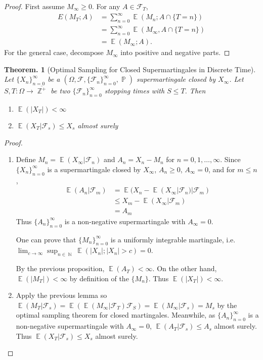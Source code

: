 \documentclass[11pt, a4paper]{memoir}
\DeclareMathOperator{\N}{{\mathbb{N}}}
\DeclareMathOperator{\Z}{{\mathbb{Z}}}
\theoremstyle{change}
\newtheorem{theorem}{Theorem.}[section]
\theoremstyle{plain}
\theoremstyle{nonumberplain}
\newtheorem{proof}{Proof}
\DeclareMathOperator{\pr}{{\mathbb{P}}}
\DeclareMathOperator{\E}{{\mathbb{E}}}
\numberwithin{equation}{section}
\begin{document}
\begin{proof}
    First assume $M_\infty\geq 0$.
    For any $A\in\mathcal{F}_T$,
    \begin{align*}
        E(M_T;A)&=\sum_{n=0}^\infty\E(M_n;A\cap\{T=n\})\\
                &=\sum_{n=0}^\infty\E(M_\infty,A\cap\{T=n\})\\
                &= \E(M_\infty;A).
    \end{align*}
    For the general case, decompose $M_\infty$ into positive and negative parts.
\end{proof}
\begin{theorem}[Optimal Sampling for Closed Supermartingales in Discrete Time]
    Let $\{X_n\}_{n=0}^\infty$ be a $(\Omega,\mathcal{F},\{\mathcal{F}_n\}_{n=0}^\infty,\pr)$ supermartingale closed by $X_\infty$.
    Let $S,T:\Omega\to\overline{\Z^+}$ be two $\{\mathcal{F}_n\}_{n=0}^\infty$ stopping times with $S\leq T$.
    Then
    \begin{enumerate}[nl]
        \item $\E(|X_T|)<\infty$
        \item $\E(X_T|\mathcal{F}_s)\leq X_s$ almost surely
    \end{enumerate}
\end{theorem}
\begin{proof}
    \begin{enumerate}[nl]
        \item Define $M_n=\E(X_\infty|\mathcal{F}_n)$ and $A_n=X_n-M_n$ for $n=0,1,\ldots,\infty$.
            Since $\{X_n\}_{n=0}^\infty$ is a supermartingale closed by $X_\infty$, $A_n\geq 0$, $A_\infty=0$, and for $m\leq n$,
            \begin{align*}
                \E(A_n|\mathcal{F}_m)&=\E(X_n-\E(X_\infty|\mathcal{F}_n)|\mathcal{F}_m)\\
                                     &\leq X_m-\E(X_\infty|\mathcal{F}_m)\\
                                     &= A_m
            \end{align*}
            Thus $\{A_n\}_{n=0}^\infty$ is a non-negative supermartingale with $A_\infty=0$.

            One can prove that $\{M_n\}_{n=0}^\infty$ is a uniformly integrable martingale, i.e. $\lim_{c\to\infty}\sup_{n\in\N}\E(|X_n|;|X_n|>c)=0$.

            By the previous proposition, $\E(A_T)<\infty$.
            On the other hand, $\E(|M_T|)<\infty$ by definition of the $\{M_n\}$.
            Thus $\E(|X_T|)<\infty$.
        \item Apply the previous lemma so $\E(M_T|\mathcal{F}_s)=\E(\E(M_\infty|\mathcal{F}_T)\mathcal{F}_S)=\E(M_\infty|\mathcal{F}_s)=M_s$ by the optimal sampling theorem for closed martingales.
            Meanwhile, as $\{A_n\}_{n=0}^\infty$ is a non-negative supermartingale with $A_\infty=0$, $\E(A_T|\mathcal{F}_s)\leq A_s$ almost surely.
            Thus $\E(X_T|\mathcal{F}_s)\leq X_s$ almost surely.
    \end{enumerate}
\end{proof}
\end{document}
